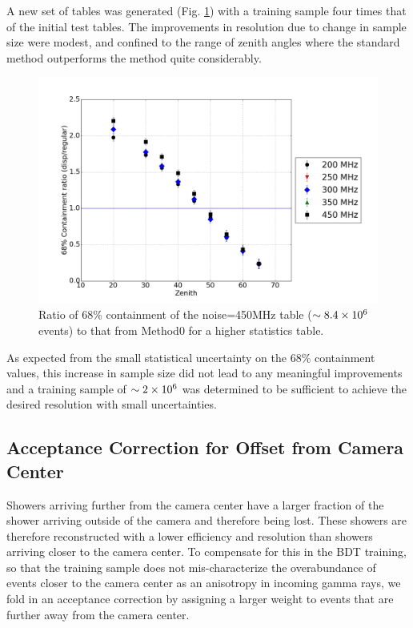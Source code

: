 \documentclass[main.tex]{subfiles}
\begin{document}
A new set of \disp tables was generated (Fig. \ref{fig:disp_ratio_450x4}) with a training sample four times that of the initial test tables. The improvements in resolution due to change in sample size were modest, and confined to the range of zenith angles where the standard method outperforms the \disp method quite considerably.

\begin{figure}[htbp]
  \centering
  \includegraphics[width=0.8\linewidth]{images/disp_450x4size_ratio_xzen}
  \caption[Higher statistics \disp table reconstruction vs noise.]{Ratio of 68\% containment of the noise=450MHz \disp table ($\sim 8.4\times 10^{6}$ events) to that from Method0 for a higher statistics \disp table.}
  \label{fig:disp_ratio_450x4}
\end{figure}

As expected from the small statistical uncertainty on the 68\% containment values, this increase in sample size did not lead to any meaningful improvements and a training sample of $\sim 2\times 10^{6}$ was determined to be sufficient to achieve the desired resolution with small uncertainties.

\subsection{Acceptance Correction for Offset from Camera Center}
Showers arriving further from the camera center have a larger fraction of the shower arriving outside of the camera and therefore being lost. These showers are therefore reconstructed with a lower efficiency and resolution than showers arriving closer to the camera center. To compensate for this in the BDT training, so that the training sample does not mis-characterize the overabundance of events closer to the camera center as an anisotropy in incoming gamma rays, we fold in an acceptance correction by assigning a larger weight to events that are further away from the camera center.
\end{document}
